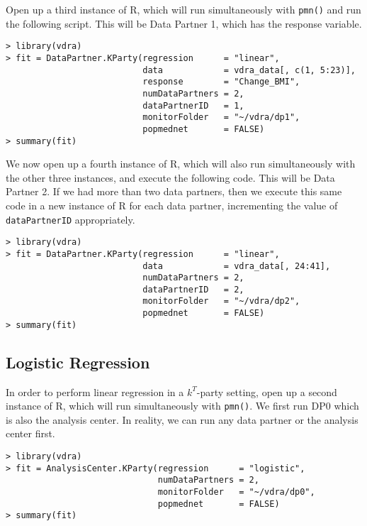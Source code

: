 \documentclass[12]{article}
\begin{document}
Open up a third instance of R, which will run simultaneously with \verb"pmn()" and run the following script.  This will be Data Partner 1, which has the response variable.

\begin{verbatim}
> library(vdra)
> fit = DataPartner.KParty(regression      = "linear",
                           data            = vdra_data[, c(1, 5:23)],
                           response        = "Change_BMI",
                           numDataPartners = 2,
                           dataPartnerID   = 1,
                           monitorFolder   = "~/vdra/dp1",
                           popmednet       = FALSE)
> summary(fit)
\end{verbatim}

We now open up a fourth instance of R, which will also run simultaneously with the other three instances, and execute the following code.  This will be Data Partner 2.  If we had more than two data partners, then we execute this same code in a new instance of R for each data partner, incrementing the value of \verb"dataPartnerID" appropriately.

\begin{verbatim}
> library(vdra)
> fit = DataPartner.KParty(regression      = "linear",
                           data            = vdra_data[, 24:41],
                           numDataPartners = 2,
                           dataPartnerID   = 2,
                           monitorFolder   = "~/vdra/dp2",
                           popmednet       = FALSE)
> summary(fit)
\end{verbatim}

\subsection{Logistic Regression}

In order to perform linear regression in a $k^T$-party setting, open up a second instance of R, which will run simultaneously with \verb"pmn()".  We first run DP0 which is also the analysis center.  In reality, we can run any data partner or the analysis center first.

\begin{verbatim}
> library(vdra)
> fit = AnalysisCenter.KParty(regression      = "logistic",
                              numDataPartners = 2,
                              monitorFolder   = "~/vdra/dp0",
                              popmednet       = FALSE)
> summary(fit)
\end{verbatim}
\end{document}
